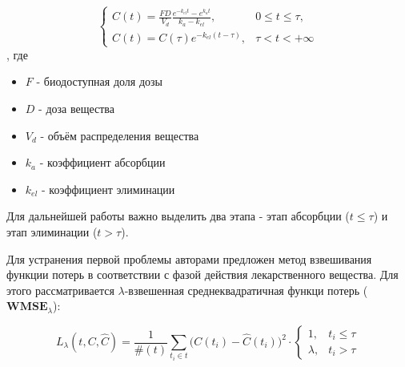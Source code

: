 \begin{vkrthesis}
	\[
		\begin{cases}
			C(t) = \frac{F D}{V_d} \frac{e^{-k_{el}t} - e^{k_a t}}{k_a - k_{el}}, & 0 \leq t \leq \tau, \\
			C(t) = C(\tau) e^{-k_{el} (t - \tau)},                                & \tau < t < +\infty
		\end{cases}
	\], где
	\begin{itemize}
		\item $F$ - биодоступная доля дозы
		\item $D$ - доза вещества
		\item $V_d$ - объём распределения вещества
		\item $k_a$ - коэффициент абсорбции
		\item $k_{el}$ - коэффициент элиминации
	\end{itemize}
	Для дальнейшей работы важно выделить два этапа - этап абсорбции ($t \leq \tau$) и этап элиминации ($t > \tau$).
	\par
	Для устранения первой проблемы авторами предложен метод взвешивания функции потерь в соответствии с фазой действия лекарственного вещества. Для этого рассматривается $\lambda$-взвешенная среднеквадратичная функци потерь ($\textbf{WMSE}_{\lambda}$):
	
	\[
		L_{\lambda}(t, C, \hat{C}) = \frac{1}{\#(t)}\sum_{t_i \in t} \Big(C(t_i)-\hat{C}(t_i)\Big)^2 \cdot
		\begin{cases}
			1,       & t_i \le \tau \\
			\lambda, & t_i > \tau
		\end{cases}
	\]
	

\end{vkrthesis}

